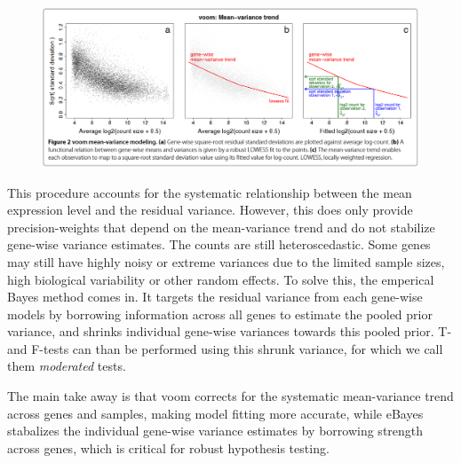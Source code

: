 \begin{figure}[t]
    \centering
    \includegraphics[width=\textwidth]{figs/voom_mean_var_trend.png}
    \caption{}
    \label{fig:voom_mean_var_trend}
\end{figure}

This procedure accounts for the systematic relationship between the mean expression level and the residual variance.
However, this does only provide precision-weights that depend on the mean-variance trend and do not stabilize gene-wise variance estimates.
The counts are still heteroscedastic. 
Some genes may still have highly noisy or extreme variances due to the limited sample sizes, high biological variability or other random effects.
To solve this, the emperical Bayes method comes in.
It targets the residual variance from each gene-wise models by borrowing information across all genes to estimate the pooled prior variance, and shrinks individual gene-wise variances towards this pooled prior.
T- and F-tests can than be performed using this shrunk variance, for which we call them \textit{moderated} tests.

The main take away is that voom corrects for the systematic mean-variance trend across genes and samples, making model fitting more accurate, while eBayes stabalizes the individual gene-wise variance estimates by borrowing strength across genes, which is critical for robust hypothesis testing.